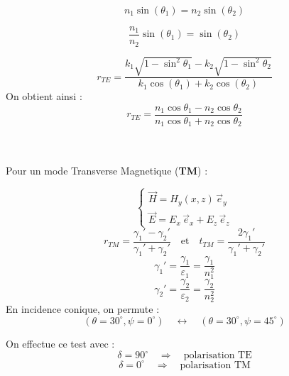 \documentclass{article}
\begin{document}
\[
n_1 \sin(\theta_1) = n_2 \sin(\theta_2)
\]

\[
\frac{n_1}{n_2} \sin(\theta_1) = \sin(\theta_2)
\]

\[
r_{TE} = \frac{
k_1 \sqrt{1 - \sin^2 \theta_1} - k_2 \sqrt{1 - \sin^2 \theta_2}
}{
k_1 \cos(\theta_1) + k_2 \cos(\theta_2)
}
\]
On obtient ainsi :
\[
r_{TE} = \frac{n_1 \cos \theta_1 - n_2 \cos \theta_2}{n_1 \cos \theta_1 + n_2 \cos \theta_2}
\]\\\

Pour un mode Transverse Magnetique (\textbf{TM}) :

\[

\left\{
\begin{array}{l}
\vec{H} = H_y(x,z)\, \vec{e}_y \\
\vec{E} = E_x\, \vec{e}_x + E_z\, \vec{e}_z
\end{array}
\right.
\]
\[
r_{TM} = \frac{\gamma_1' - \gamma_2'}{\gamma_1' + \gamma_2'}
\quad \text{et} \quad
t_{TM} = \frac{2 \gamma_1'}{\gamma_1' + \gamma_2'}
\]
\[
\gamma_1' = \frac{\gamma_1}{\varepsilon_1}=\frac{\gamma_1}{n_1^2}
\]
\[
\gamma_2' = \frac{\gamma_2}{\varepsilon_2}=\frac{\gamma_2}{n_2^2}
\]
En incidence conique, on permute :
\[
(\theta = 30^\circ, \psi = 0^\circ) \quad \leftrightarrow \quad (\theta = 30^\circ, \psi = 45^\circ)
\]

On effectue ce test avec :
\[
\delta = 90^\circ \quad \Rightarrow \quad \text{polarisation TE}
\]
\[
\delta = 0^\circ \quad \Rightarrow \quad \text{polarisation TM}
\]
\end{document}
